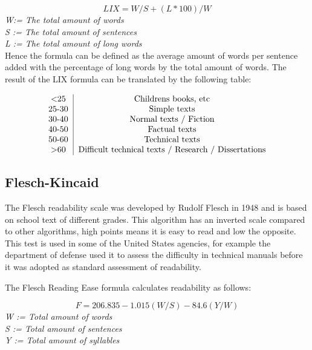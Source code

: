 \documentclass[a4paper]{article}
\begin{document}
\begin{equation}
    LIX = W/S+(L*100)/W
\end{equation}
\emph{W:= The total amount of words}\\
\emph{S := The total amount of sentences}\\
\emph{L := The total amount of long words}\\

Hence the formula can be defined as the average amount of words per sentence added with the percentage of long words by the total amount of words. The result of the LIX formula can be translated by the following table:

\begin{equation}
    \begin{tabular}{c|c}
        \textless 25    &   Childrens books, etc\\
        25-30   &   Simple texts \\
        30-40   &   Normal texts / Fiction \\
        40-50   &   Factual texts\\
        50-60   &   Technical texts \\
        \textgreater 60    &   Difficult technical texts / Research / Dissertations
    \end{tabular}
\end{equation}

\subsection{Flesch-Kincaid}

The Flesch readability scale was developed by Rudolf Flesch in 1948 and is based on school text of different grades\cite{navy75}. This algorithm has an inverted scale compared to other algorithms, high points means it is easy to read and low the opposite. This test is used in some of the United States agencies, for example the department of defense used it to assess the difficulty in technical manuals before it was adopted as standard assessment of readability\cite{navy75, mcclure87}.

The Flesch Reading Ease formula calculates readability as follows:

\begin{equation}
F = 206.835 - 1.015(W/S) - 84.6(Y/W)
\end{equation}
\emph{W := Total amount of words}\\
\emph{S := Total amount of sentences}\\
\emph{Y := Total amount of syllables}\\
\end{document}
